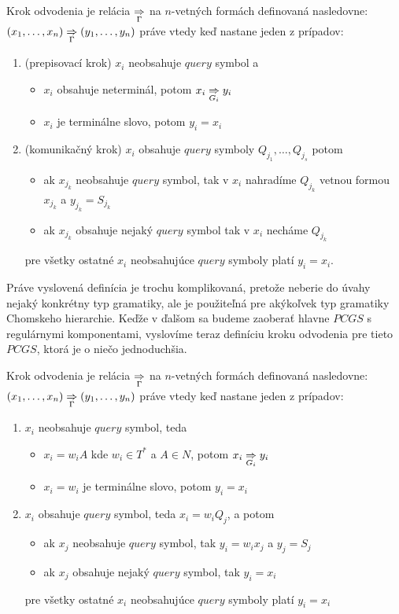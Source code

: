 \begin{definicia}
  Krok odvodenia je relácia $\underset{\Gamma}{\Rightarrow}$ na $n$-vetných
  formách definovaná nasledovne: $(x_1,\dots
  ,x_n)\underset{\Gamma}{\Rightarrow} (y_1,\dots ,y_n)$ práve vtedy keď
  nastane jeden z prípadov:
  \begin{enumerate}
    \item (prepisovací krok) $x_i$ neobsahuje $query$ symbol a
      \begin{itemize}
        \item $x_i$ obsahuje neterminál, potom $x_i\underset{G_i}{\Rightarrow} y_i$
        \item $x_i$ je terminálne slovo, potom $y_i=x_i$
      \end{itemize}
    \item (komunikačný krok) $x_i$ obsahuje $query$ symboly $Q_{j_1},\dots ,Q_{j_s}$ potom
      \begin{itemize}
        \item ak $x_{j_k}$ neobsahuje $query$ symbol, tak v $x_i$ nahradíme
        $Q_{j_k}$ vetnou formou $x_{j_k}$ a \mbox{$y_{j_k}=S_{j_k}$}
        \item ak $x_{j_k}$ obsahuje nejaký $query$ symbol tak v $x_i$ necháme $Q_{j_k}$
      \end{itemize}
      pre všetky ostatné $x_i$ neobsahujúce $query$ symboly platí
      $y_i=x_i$.
  \end{enumerate}
\end{definicia}

Práve vyslovená definícia je trochu komplikovaná, pretože neberie
do úvahy nejaký konkrétny typ gramatiky, ale je použiteľná pre
akýkoľvek typ gramatiky Chomskeho hierarchie. Keďže v ďalšom sa
budeme zaoberať hlavne $PCGS$ s regulárnymi komponentami,
vyslovíme teraz definíciu kroku odvodenia pre tieto $PCGS$, ktorá
je o niečo jednoduchšia.

\begin{definicia}
  Krok odvodenia je relácia $\underset{\Gamma}{\Rightarrow}$ na $n$-vetných
  formách definovaná nasledovne: $(x_1,\dots
  ,x_n)\underset{\Gamma}{\Rightarrow} (y_1,\dots ,y_n)$ práve vtedy keď
  nastane jeden z prípadov:
  \begin{enumerate}
    \item $x_i$ neobsahuje $query$ symbol, teda
    \begin{itemize}
      \item $x_i=w_iA$ kde $w_i\in T^*$ a $A\in N$, potom $x_i\underset{G_i}{\Rightarrow} y_i$
      \item $x_i=w_i$ je terminálne slovo, potom $y_i=x_i$
    \end{itemize}
    \item $x_i$ obsahuje $query$ symbol, teda $x_i=w_iQ_j$, a potom
    \begin{itemize}
      \item ak $x_j$ neobsahuje $query$ symbol, tak $y_i=w_ix_j$ a $y_j=S_j$
      \item ak $x_j$ obsahuje nejaký $query$ symbol, tak $y_i=x_i$
    \end{itemize}
    pre všetky ostatné $x_i$ neobsahujúce $query$ symboly platí
    $y_i=x_i$
  \end{enumerate}
\end{definicia}

